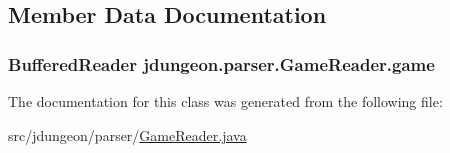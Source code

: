 \subsection{Member Data Documentation}
\hypertarget{classjdungeon_1_1parser_1_1_game_reader_a71a3526a8a907cd4782a4aaa0b641d91}{
\subsubsection[{game}]{\setlength{\rightskip}{0pt plus 5cm}BufferedReader {\bf jdungeon.parser.GameReader.game}}}
\label{classjdungeon_1_1parser_1_1_game_reader_a71a3526a8a907cd4782a4aaa0b641d91}


The documentation for this class was generated from the following file:\begin{DoxyCompactItemize}
\item 
src/jdungeon/parser/\hyperlink{_game_reader_8java}{GameReader.java}\end{DoxyCompactItemize}
